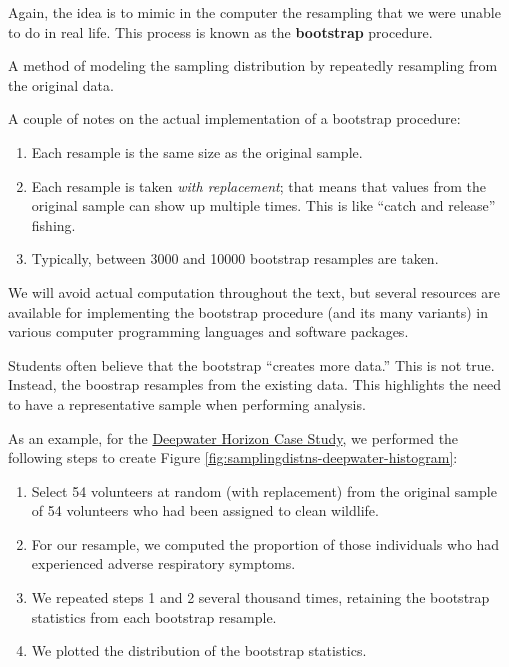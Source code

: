 \documentclass[]{book}
\providecommand{\tightlist}{%
  \setlength{\itemsep}{0pt}\setlength{\parskip}{0pt}}
\theoremstyle{definition}
\theoremstyle{definition}
\theoremstyle{definition}
\theoremstyle{remark}
\let\BeginKnitrBlock\begin \let\EndKnitrBlock\end
\begin{document}
Again, the idea is to mimic in the computer the resampling that we were
unable to do in real life. This process is known as the
\textbf{bootstrap} procedure.

\BeginKnitrBlock{definition}[Bootstrap]
\protect\hypertarget{def:defn-bootstrap}{}{\label{def:defn-bootstrap}
{} }A method of modeling the sampling
distribution by repeatedly resampling from the original data.
\EndKnitrBlock{definition}

A couple of notes on the actual implementation of a bootstrap procedure:

\begin{enumerate}
\def\labelenumi{\arabic{enumi}.}
\tightlist
\item
  Each resample is the same size as the original sample.
\item
  Each resample is taken \emph{with replacement}; that means that values
  from the original sample can show up multiple times. This is like
  ``catch and release'' fishing.
\item
  Typically, between 3000 and 10000 bootstrap resamples are taken.
\end{enumerate}

We will avoid actual computation throughout the text, but several
resources are available for implementing the bootstrap procedure (and
its many variants) in various computer programming languages and
software packages.

\BeginKnitrBlock{rmdtip}
Students often believe that the bootstrap ``creates more data.'' This is
not true. Instead, the boostrap resamples from the existing data. This
highlights the need to have a representative sample when performing
analysis.
\EndKnitrBlock{rmdtip}

As an example, for the \protect\hyperlink{CaseDeepwater}{Deepwater
Horizon Case Study}, we performed the following steps to create Figure
\ref{fig:samplingdistns-deepwater-histogram}:

\begin{enumerate}
\def\labelenumi{\arabic{enumi}.}
\tightlist
\item
  Select 54 volunteers at random (with replacement) from the original
  sample of 54 volunteers who had been assigned to clean wildlife.
\item
  For our resample, we computed the proportion of those individuals who
  had experienced adverse respiratory symptoms.
\item
  We repeated steps 1 and 2 several thousand times, retaining the
  bootstrap statistics from each bootstrap resample.
\item
  We plotted the distribution of the bootstrap statistics.
\end{enumerate}
\end{document}
